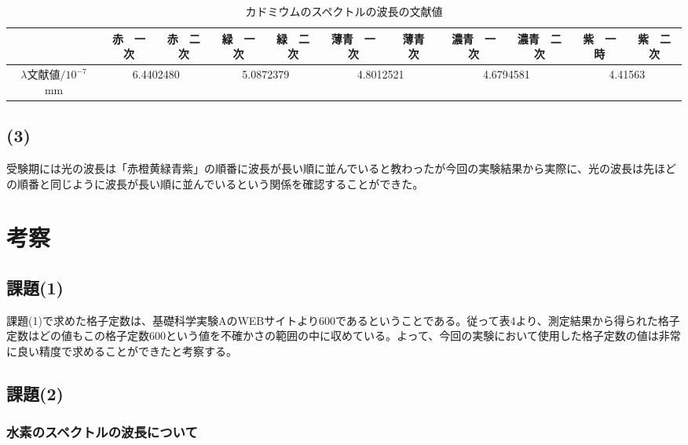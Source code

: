 \documentclass{jsarticle}
\begin{document}
\begin{landscape}
\begin{table}[H]
    \centering
    \caption{カドミウムのスペクトルの波長の文献値}
    \label{my-label}
    \begin{tabular}{|c|c|c|c|c|c|c|c|c|c|c|}
    \hline
                 & 赤　一次           & 赤　二次          & 緑　一次           & 緑　二次          & 薄青　一次          & 薄青　次          & 濃青　一次          & 濃青　二次         & 紫　一時          & 紫　二次         \\ \hline
    $\lambda$文献値$ /10^{-7}$mm & \multicolumn{2}{c|}{6.4402480} & \multicolumn{2}{c|}{5.0872379} & \multicolumn{2}{c|}{4.8012521} & \multicolumn{2}{c|}{4.6794581} & \multicolumn{2}{c|}{4.41563} \\ \hline
    \end{tabular}
    \end{table}
\end{landscape}

\subsection{(3)}

受験期には光の波長は「赤橙黄緑青紫」の順番に波長が長い順に並んでいると教わったが今回の実験結果から実際に、光の波長は先ほどの順番と同じように波長が長い順に並んでいるという関係を確認することができた。

\section{考察}

\subsection{課題(1)}

課題(1)で求めた格子定数は、基礎科学実験AのWEBサイトより600であるということである。従って表4より、測定結果から得られた格子定数はどの値もこの格子定数600という値を不確かさの範囲の中に収めている。よって、今回の実験において使用した格子定数の値は非常に良い精度で求めることができたと考察する。

\subsection{課題(2)}

\subsubsection{水素のスペクトルの波長について}
\end{document}

